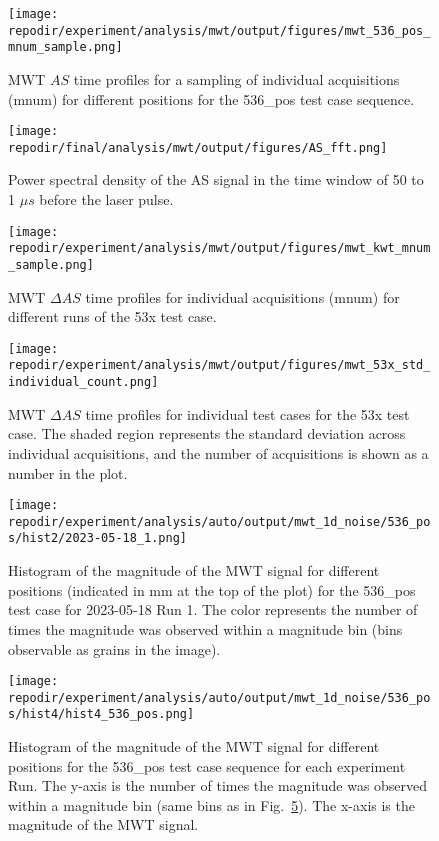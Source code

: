 \begin{figure}[]
\centering
\texttt{[image: \\repodir/experiment/analysis/mwt/output/figures/mwt\_536\_pos\_mnum\_sample.png]}
\caption{MWT $AS$ time profiles for a sampling of individual acquisitions (mnum) for different positions for the 536\_pos test case sequence.}
\label{fig:SI_mwt_536_pos_mnum_sample}%
\end{figure}

\begin{figure}
    \centering
    \texttt{[image: \\repodir/final/analysis/mwt/output/figures/AS\_fft.png]} 
    \caption{Power spectral density of the AS signal in the time window of 50 to 1 $\mu s$ before the laser pulse.}
    \label{fig:SI_AS_fft}
\end{figure}

\begin{figure}
    \centering
    \texttt{[image: \\repodir/experiment/analysis/mwt/output/figures/mwt\_kwt\_mnum\_sample.png]} 
    \caption{MWT $\Delta AS$ time profiles for individual acquisitions (mnum) for different runs of the 53x test case.  }
    \label{fig:SI_mwt_kwt_mnum_sample}
\end{figure}

\begin{figure}
    \centering
    \texttt{[image: \\repodir/experiment/analysis/mwt/output/figures/mwt\_53x\_std\_individual\_count.png]} 
    \caption{MWT $\Delta AS$ time profiles for individual test cases for the 53x test case. The shaded region represents the standard deviation across individual acquisitions, and the number of acquisitions is shown as a number in the plot.}
    \label{fig:SI_mwt_53x_std_individual_count}
\end{figure}

\begin{figure}
    \centering
    \texttt{[image: \\repodir/experiment/analysis/auto/output/mwt\_1d\_noise/536\_pos/hist2/2023-05-18\_1.png]} 
    \caption{Histogram of the magnitude of the MWT signal for different positions (indicated in mm at the top of the plot) for the 536\_pos test case for 2023-05-18 Run 1. The color represents the number of times the magnitude was observed within a magnitude bin (bins observable as grains in the image). }
    \label{fig:SI_mwt_1d_noise_536_pos_hist2_2023-05-18_1}
\end{figure}

\begin{figure}
    \centering
    \texttt{[image: \\repodir/experiment/analysis/auto/output/mwt\_1d\_noise/536\_pos/hist4/hist4\_536\_pos.png]} 
    \caption{Histogram of the magnitude of the MWT signal for different positions for the 536\_pos test case sequence for each experiment Run. The y-axis is the number of times the magnitude was observed within a magnitude bin (same bins as in Fig.\ \ref{fig:SI_mwt_1d_noise_536_pos_hist2_2023-05-18_1}). The x-axis is the magnitude of the MWT signal.}
    \label{fig:SI_mwt_1d_noise_536_pos_hist4_hist4_536_pos}
\end{figure}

